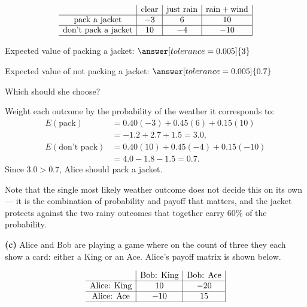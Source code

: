 \documentclass[12pt]{ximera}
\begin{document}
\begin{problem}
\begin{prompt}
\[
\begin{array}{c|c|c|c|}
\phantom{|} & \text{clear} & \text{just rain} & \text{rain}+\text{wind} \\\hline
\text{pack a jacket} & -3 & 6 & 10 \\\hline
\text{don't pack a jacket} & 10 & -4 & -10 \\\hline
\end{array}
\]

Expected value of packing a jacket: $\answer[tolerance=0.005]{3}$

\smallskip
Expected value of not packing a jacket: $\answer[tolerance=0.005]{0.7}$

\smallskip
Which should she choose?
\begin{multipleChoice}
\end{multipleChoice}

\begin{feedback}
Weight each outcome by the probability of the weather it corresponds to:
\begin{align*}
E(\text{pack}) &= 0.40(-3) + 0.45(6) + 0.15(10)\\
&= -1.2 + 2.7 + 1.5 = 3.0,\\[4pt]
E(\text{don't pack}) &= 0.40(10) + 0.45(-4) + 0.15(-10)\\
&= 4.0 - 1.8 - 1.5 = 0.7.
\end{align*}
Since $3.0 > 0.7$, Alice should pack a jacket.

Note that the single most likely weather outcome does not decide this on its own ---
it is the combination of probability and payoff that matters, and the jacket protects
against the two rainy outcomes that together carry $60\%$ of the probability.
\end{feedback}
\end{prompt}

\begin{prompt}
\textbf{(c)} Alice and Bob are playing a game where on the count of three they each
show a card: either a King or an Ace. Alice's payoff matrix is shown below.

\[
\begin{array}{c|c|c|}
\phantom{|} & \text{Bob: King} & \text{Bob: Ace} \\\hline
\text{Alice: King} & 10 & -20 \\\hline
\text{Alice: Ace} & -10 & 15 \\\hline
\end{array}
\]


\end{prompt}
\end{problem}
\end{document}
